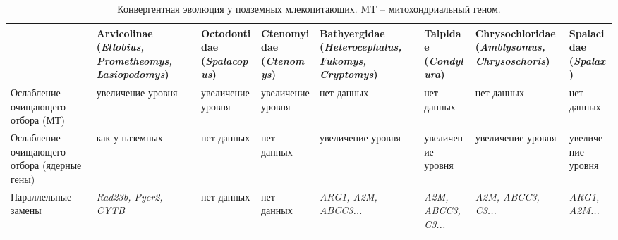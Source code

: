 \begin{landscape}

\begin{table}[]
	\caption{Конвергентная эволюция у подземных млекопитающих. MT -- митохондриальный геном.}\label{convergent_all} \vspace{5mm}
	
	\begin{tabular}{|p{3cm}|p{3cm}|p{2.8cm}|p{2.7cm}|p{3.4cm}|p{2.7cm}|p{3.3cm}|p{2.8cm}|}
		\hline
		\multicolumn{1}{|c|}{} & \textbf{Arvicolinae (\textit{Ellobius, Prometheomys, Lasiopodomys})} & \textbf{Octodontidae (\textit{Spalacopus})} & \textbf{Ctenomyidae (\textit{Ctenomys})} & \textbf{Bathyergidae (\textit{Heterocephalus, Fukomys, Cryptomys})} & \textbf{Talpidae (\textit{Condylura})} & \textbf{Chrysochloridae (\textit{Amblysomus, Chrysoschoris})} & \textbf{Spalacidae (\textit{Spalax})} \\ \hline
		Ослабление очищающего отбора (МТ) & увеличение уровня & увеличение уровня & увеличение уровня & нет данных & нет данных & нет данных & нет данных \\ \hline
		Ослабление очищающего отбора (ядерные гены) & как у наземных & нет данных & нет данных & увеличение уровня & увеличение уровня & увеличение уровня & увеличение уровня \\ \hline
		Параллельные замены & \textit{Rad23b, Pycr2, CYTB} & нет данных & нет данных & \textit{ARG1, A2M, ABCC3...} & \textit{A2M, ABCC3, C3...} & \textit{A2M, ABCC3, C3...} & \textit{ARG1, A2M...} \\ \hline
	\end{tabular}
\end{table}

\end{landscape}